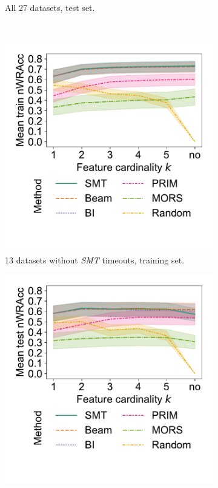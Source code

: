 \documentclass{article}
\theoremstyle{definition}
\begin{document}
\begin{figure}[t]
\begin{subfigure}[t]{0.48\textwidth}
		\caption{All 27 datasets, test set.}
		\label{fig:csd:cardinality-test-nwracc-all-datasets}
	\end{subfigure}
	\\
	\begin{subfigure}[t]{0.48\textwidth}
		\centering
		\includegraphics[width=\textwidth, trim=15 55 15 15, clip]{plots/csd-cardinality-train-nwracc-no-timeout-datasets.pdf}
		\caption{13 datasets without \emph{SMT} timeouts, training set.}
		\label{fig:csd:cardinality-train-nwracc-no-timeout-datasets}
	\end{subfigure}
	\hfill
	\begin{subfigure}[t]{0.48\textwidth}
		\centering
		\includegraphics[width=\textwidth, trim=15 55 15 15, clip]{plots/csd-cardinality-test-nwracc-no-timeout-datasets.pdf}

\end{subfigure}
\end{figure}
\end{document}
